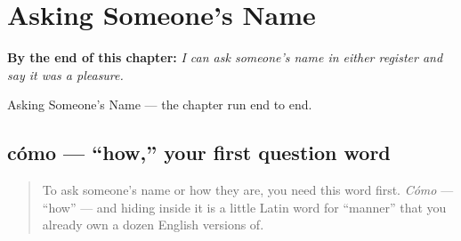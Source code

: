 
\chapter{Asking Someone's Name}
\label{ch:asking-a-name}

\begin{chapteropening}
\textbf{By the end of this chapter:} \emph{I can ask someone's name in either register and say it was a pleasure.}

Asking Someone's Name — the chapter run end to end.
\end{chapteropening}

\section[cómo]{cómo — \textquotedblleft{}how,\textquotedblright{} your first question word}

\label{lesson:ES-C03-como}



\begin{quote}
To ask someone's name or how they are, you need this word first. \emph{Cómo} — \textquotedblleft{}how\textquotedblright{} — and hiding inside it is a little Latin word for \textquotedblleft{}manner\textquotedblright{} that you already own a dozen English versions of.
\end{quote}

